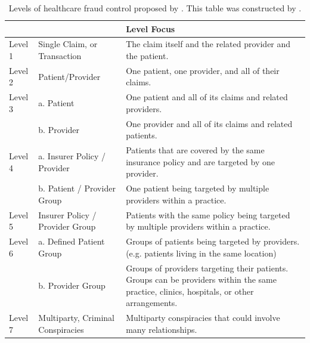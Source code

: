 \documentclass[dvipdfmx, english]{ampmt}             %
\begin{document}
\begin{table}[H]
\centering
\caption{Levels of healthcare fraud control proposed by \cite{Survey}. This table was constructed by \cite{Multidim}.}
\begin{tabularx}{\linewidth}{llX}
  \hline \hline
  & & Level Focus \\ \hline
Level 1 & Single Claim, or Transaction &  The claim itself and the related provider and the patient.\\
  Level 2 & Patient/Provider & One patient, one provider, and all of their claims.\\
  Level 3 &  a. Patient & One patient and all of its claims and related providers.\\
  	      &  b. Provider & One provider and all of its claims and related patients. \\
  Level 4 & a. Insurer Policy / Provider & Patients that are covered by the same insurance policy and are targeted by one provider. \\
  	      & b. Patient / Provider Group & One patient being targeted by multiple providers within a practice. \\
  Level 5 & Insurer Policy / Provider Group & Patients with the same policy being targeted by multiple providers within a practice.\\
  Level 6 & a. Defined Patient Group & Groups of patients being targeted by providers. (e.g. patients living in the same location) \\
               &  b. Provider Group & Groups of providers targeting their patients. Groups can be providers within the same practice, clinics, hospitals, or other arrangements. \\
  Level 7 & Multiparty, Criminal Conspiracies & Multiparty conspiracies that could involve many relationships. \\
   \hline

\end{tabularx}
\label{tb:level}
\addtocounter{table}{-1}
\end{table}
\end{document}
